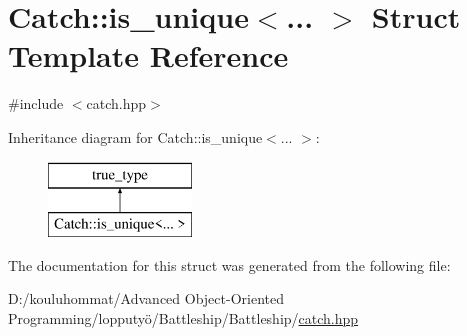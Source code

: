 \hypertarget{struct_catch_1_1is__unique}{}\section{Catch\+:\+:is\+\_\+unique$<$... $>$ Struct Template Reference}
\label{struct_catch_1_1is__unique}


{\ttfamily \#include $<$catch.\+hpp$>$}

Inheritance diagram for Catch\+:\+:is\+\_\+unique$<$... $>$\+:\begin{figure}[H]
\begin{center}
\leavevmode
\includegraphics[height=2.000000cm]{struct_catch_1_1is__unique}
\end{center}
\end{figure}


The documentation for this struct was generated from the following file\+:\begin{DoxyCompactItemize}
\item 
D\+:/kouluhommat/\+Advanced Object-\/\+Oriented Programming/lopputyö/\+Battleship/\+Battleship/\mbox{\hyperlink{catch_8hpp}{catch.\+hpp}}\end{DoxyCompactItemize}
